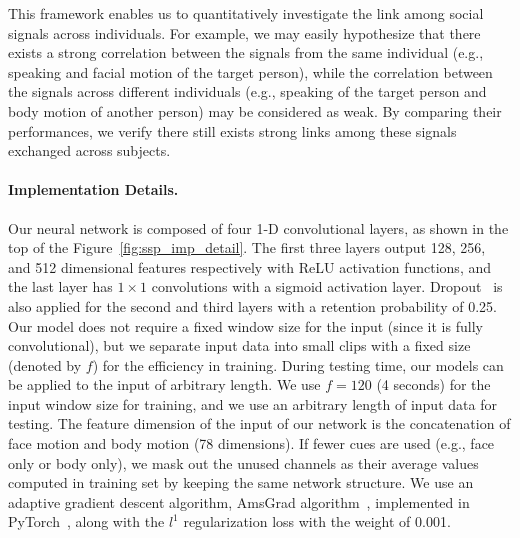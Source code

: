 This framework enables us to quantitatively investigate the link among social signals across individuals. For example, we may easily hypothesize that there exists a strong correlation between the signals from the same individual (e.g., speaking and facial motion of the target person), while the correlation between the signals across different individuals (e.g., speaking of the target person and body motion of another person) may be considered as weak. By comparing their performances, we verify there still exists strong links among these signals exchanged across subjects. 


\paragraph{Implementation Details.}
Our neural network is composed of four 1-D convolutional layers, as shown in the top of the Figure~\ref{fig:ssp_imp_detail}. The first three layers output 128, 256, and 512 dimensional features respectively with ReLU activation functions, and the last layer has $1\times1$ convolutions with a sigmoid activation layer. Dropout~\cite{srivastava2014dropout} is also applied for the second and third layers with a retention probability of 0.25. Our model does not require a fixed window size for the input (since it is fully convolutional), but we separate input data into small clips with a fixed size (denoted by $f$) for the efficiency in training. During testing time, our models can be applied to the input of arbitrary length. We use $f=120$ (4 seconds) for the input window size for training, and we use an arbitrary length of input data for testing. The feature dimension of the input of our network is the concatenation of face motion and body motion (78 dimensions). If fewer cues are used (e.g., face only or body only), we mask out the unused channels as their average values computed in training set by keeping the same network structure. We use an adaptive gradient descent algorithm, AmsGrad algorithm~\cite{reddi2018convergence}, implemented in PyTorch~\cite{paszke2017automatic}, along with the $l^1$ regularization loss with the weight of 0.001. 

